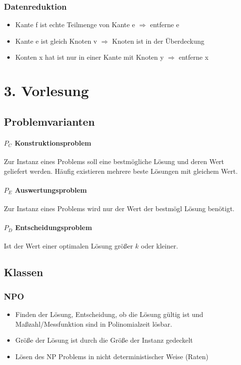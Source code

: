 \documentclass[ngerman]{scrartcl}
\begin{document}
\subsubsection{Datenreduktion}
\begin{itemize}
  \item Kante f ist echte Teilmenge von Kante e $ \Rightarrow $ entferne e
  \item Kante e ist gleich Knoten v $ \Rightarrow $ Knoten ist in der Überdeckung
  \item Konten x hat ist nur in einer Kante mit Knoten y $ \Rightarrow $ entferne x
\end{itemize}

\section{3. Vorlesung}
\subsection{Problemvarianten}

\paragraph{$ P_C $ Konstruktionsproblem} Zur Instanz eines Problems soll eine bestmögliche Lösung und deren Wert geliefert werden. Häufig existieren mehrere beste Lösungen mit gleichem Wert.

\paragraph{$ P_E $ Auswertungsproblem} Zur Instanz eines Problems wird nur der Wert der bestmögl Lösung benötigt.

\paragraph{$ P_D $ Entscheidungsproblem} Ist der Wert einer optimalen Lösung größer $ k $ oder kleiner.

\subsection{Klassen}
\subsubsection*{NPO}
\begin{itemize}
  \item Finden der Lösung, Entscheidung, ob die Lösung gültig ist und Maßzahl/Messfunktion sind in Polinomialzeit lösbar.
  \item Größe der Lösung ist durch die Größe der Instanz gedeckelt
  \item Lösen des NP Problems in nicht deterministischer Weise (Raten)
\end{itemize}
\end{document}
